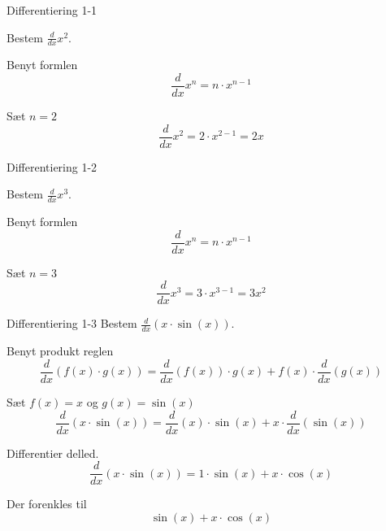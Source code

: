 \documentclass{article}
\begin{document}

\tableofcontents
\newpage

\begin{exercise}{Differentiering 1-1}

Bestem $\frac{d}{dx} x^2$.


\hint

Benyt formlen
\[
\frac{d}{dx} x^n = n \cdot x^{n - 1}
\]

\hint

Sæt $n = 2$
\[
\frac{d}{dx} x^2 = 2 \cdot x^{2 - 1} = 2 x
\]

\end{exercise}

\begin{exercise}{Differentiering 1-2}

Bestem $\frac{d}{dx} x^3$.


\hint

Benyt formlen
\[
\frac{d}{dx} x^n = n \cdot x^{n - 1}
\]

\hint

Sæt $n = 3$
\[
\frac{d}{dx} x^3 = 3 \cdot x^{3 - 1} = 3 x^2
\]

\end{exercise}


\begin{exercise}{Differentiering 1-3}
Bestem $\frac{d}{dx} \left( x \cdot \sin(x) \right)$.


\hint
Benyt produkt reglen
\[
\frac{d}{dx} \left( f(x) \cdot g(x) \right) = \frac{d}{dx} \left( f(x) \right) \cdot g(x) + f(x) \cdot \frac{d}{dx} \left( g(x) \right)
\]

\hint
Sæt $f(x) = x$ og $g(x) = \sin(x)$
\[
\frac{d}{dx} \left( x \cdot \sin(x) \right) = \frac{d}{dx} \left( x \right) \cdot \sin(x) + x \cdot \frac{d}{dx} \left( \sin(x) \right)
\]

\hint
Differentier delled.
\[
\frac{d}{dx} \left( x \cdot \sin(x) \right) = 1 \cdot \sin(x) + x \cdot \cos(x)
\]

\hint
Der forenkles til
\[
\sin(x) + x \cdot \cos(x)
\]

\end{exercise}
\end{document}
